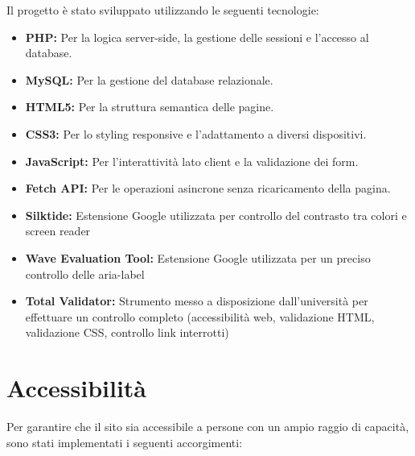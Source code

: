 \documentclass{article}
\begin{document}
Il progetto è stato sviluppato utilizzando le seguenti tecnologie:

\begin{itemize}
    \item \textbf{PHP:} Per la logica server-side, la gestione delle sessioni e l'accesso al database.
    
    \item \textbf{MySQL:} Per la gestione del database relazionale.
    
    \item \textbf{HTML5:} Per la struttura semantica delle pagine.
    
    \item \textbf{CSS3:} Per lo styling responsive e l'adattamento a diversi dispositivi.
    
    \item \textbf{JavaScript:} Per l'interattività lato client e la validazione dei form.
    
    \item \textbf{Fetch API:} Per le operazioni asincrone senza ricaricamento della pagina.
    
    \item \textbf{Silktide:} Estensione Google utilizzata per controllo del contrasto tra colori e screen reader

    \item \textbf{Wave Evaluation Tool:} Estensione Google utilizzata per un preciso controllo delle aria-label

    \item \textbf{Total Validator:} Strumento messo a disposizione dall'università per effettuare un controllo completo (accessibilità web, validazione HTML, validazione CSS, controllo link interrotti)


\end{itemize}

\section{Accessibilità}

Per garantire che il sito sia accessibile a persone con un ampio raggio di capacità, sono stati implementati i seguenti accorgimenti:
\end{document}
